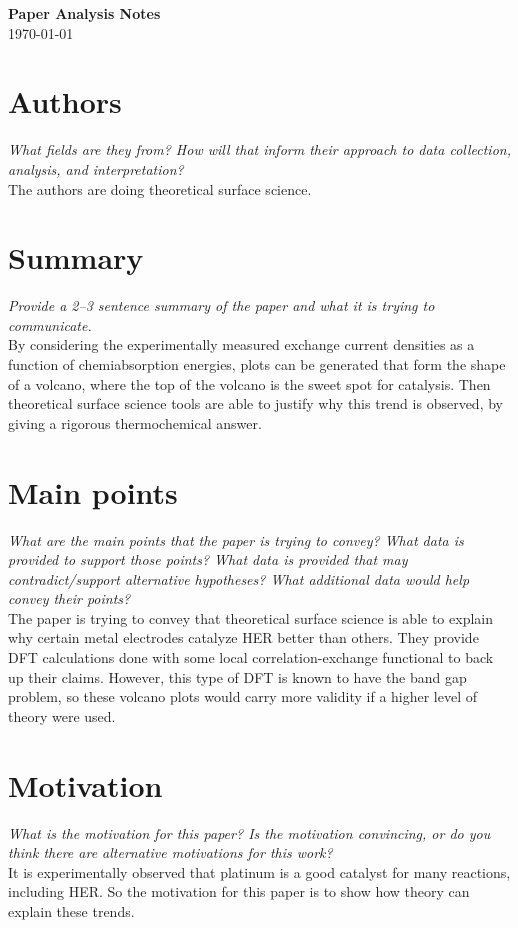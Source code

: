 \documentclass[12pt]{article}
\begin{document}
\begin{center}
    {\LARGE \textbf{Paper Analysis Notes}}\\[6pt]
    \today
\end{center}


\section*{Authors}
\textit{What fields are they from? How will that inform their approach to data collection, analysis, and interpretation?}\\[4pt]
The authors are doing theoretical surface science.

\section*{Summary}
\textit{Provide a 2--3 sentence summary of the paper and what it is trying to communicate.}\\[4pt]
By considering the experimentally measured exchange current densities as a function of chemiabsorption energies, plots can be generated that form the shape of a volcano, where the top of the volcano is the sweet spot for catalysis. Then theoretical surface science tools are able to justify why this trend is observed, by giving a rigorous thermochemical answer.

\section*{Main points}
\textit{What are the main points that the paper is trying to convey? What data is provided to support those points? What data is provided that may contradict/support alternative hypotheses? What additional data would help convey their points?}\\[4pt]
The paper is trying to convey that theoretical surface science is able to explain why certain metal electrodes catalyze HER better than others. They provide DFT calculations done with some local correlation-exchange functional to back up their claims. However, this type of DFT is known to have the band gap problem, so these volcano plots would carry more validity if a higher level of theory were used.

\section*{Motivation}
\textit{What is the motivation for this paper? Is the motivation convincing, or do you think there are alternative motivations for this work?}\\[4pt]
It is experimentally observed that platinum is a good catalyst for many reactions, including HER. So the motivation for this paper is to show how theory can explain these trends. 
\end{document}
